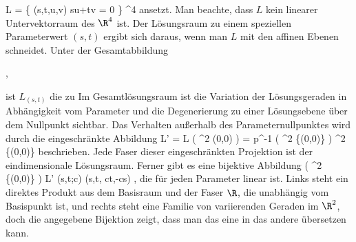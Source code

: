 {\mavergleichskettedisp
{\vergleichskette
{L
}
{ =} { \left\{ (s,t,u,v)  \mid  su+tv = 0         \right\}
}
{ \subseteq} { \R^4
}
{ } {
}
{ } {
}
}
{}{}{}
ansetzt. Man beachte, dass $L$ kein linearer Untervektorraum des $\R^4$ ist. Der Lösungsraum zu einem speziellen Parameterwert $(s,t)$ ergibt sich daraus, wenn man $L$  mit den affinen Ebenen
 schneidet. Unter der Gesamtabbildung

 { , }

ist $L_{(s,t)}$ die
zu
 Im Gesamtlösungsraum ist die Variation der Lösungsgeraden in Abhängigkeit vom Parameter und die Degenerierung zu einer Lösungsebene über dem Nullpunkt sichtbar. Das Verhalten außerhalb des Parameternullpunktes wird durch die eingeschränkte Abbildung
\maabbdisp {} {L' = L \setminus \left(  \R^2 \times (0,0)  \right) =  p^{-1} \left(  \R^2 \setminus \{(0,0)\}   \right) } {\R^2 \setminus \{(0,0)\}
} {}
beschrieben. Jede Faser dieser eingeschränkten Projektion ist der eindimensionale Lösungsraum. Ferner gibt es eine bijektive Abbildung
\maabbeledisp {} { \left(  \R^2 \setminus \{(0,0)\}  \right) \times \R } { L'
} {(s,t;c)} { (s,t, ct,-cs)
} {,}
die für jeden Parameter
 linear ist. Links steht ein direktes Produkt aus dem Basisraum
 und der Faser $\R$, die unabhängig vom Basispunkt ist, und rechts steht eine Familie von variierenden Geraden im $\R^2$, doch die angegebene Bijektion zeigt, dass man das eine in das andere übersetzen kann.





}


